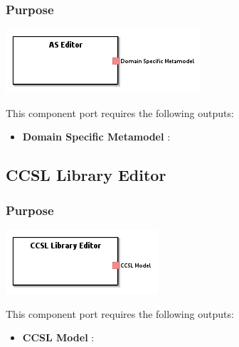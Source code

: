 \documentclass{gemoc} %
\begin{document}

\subsubsection{Purpose}

\begin{center}
\includegraphics*[trim=0.0cm 0.0cm 0cm 0.0cm, clip=true]{../images/generated/Generated_AS_Editor.png}
\end{center}


This component port requires the following outputs:
\begin{itemize}
  \item \textbf{Domain Specific Metamodel} :
\end{itemize}

\subsection{CCSL Library Editor}


\subsubsection{Purpose}

\begin{center}
\includegraphics*[trim=0.0cm 0.0cm 0cm 0.0cm, clip=true]{../images/generated/Generated_CCSL_Library_Editor.png}
\end{center}


This component port requires the following outputs:
\begin{itemize}
  \item \textbf{CCSL Model} :
\end{itemize}
\end{document}
